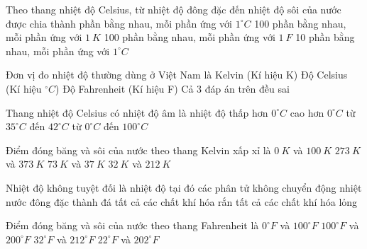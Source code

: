 \begin{ex}
	Theo thang nhiệt độ Celsius, từ nhiệt độ đông đặc đến nhiệt độ sôi của nước được chia thành
	\choice
	{ phần bằng nhau, mỗi phần ứng với $1^\circ C$}
	{100 phần bằng nhau, mỗi phần ứng với $1\ K$}
	{100 phần bằng nhau, mỗi phần ứng với $1\ F$}
	{10 phần bằng nhau, mỗi phần ứng với $1^\circ C$}
\end{ex}

\begin{ex}
	Đơn vị đo nhiệt độ thường dùng ở Việt Nam là
	\choice
	{Kelvin (Kí hiệu K)}
	{\True Độ Celsius (Kí hiệu $^\circ C$)}
	{Độ Fahrenheit (Kí hiệu F)}
	{Cả 3 đáp án trên đều sai}
\end{ex}
\begin{ex}
	Thang nhiệt độ Celsius có nhiệt độ âm là nhiệt độ
	\choice
	{\True thấp hơn $0^\circ C$}
	{cao hơn $0^\circ C$}
	{từ $35^\circ C$ đến $42^\circ C$}
	{từ $0^\circ C$ đến $100^\circ C$}
	\end{ex}



\begin{ex}
	Điểm đóng băng và sôi của nước theo thang Kelvin xấp xỉ là
	\choice
	{$0\ K$ và $100\ K$}
	{\True $273\ K$ và $373\ K$}
	{$73\ K$ và $37\ K$}
	{$32\ K$ và $212\ K$}
	\end{ex}


\begin{ex}
	Nhiệt độ không tuyệt đối là nhiệt độ tại đó 
	\choice
	{\True các phân tử không chuyển động nhiệt}
	{nước đông đặc thành đá}
	{tất cả các chất khí hóa rắn}
	{tất cả các chất khí hóa lỏng}
	\end{ex}
\begin{ex}
	Điểm đóng băng và sôi của nước theo thang Fahrenheit là
	\choice
	{$0^\circ F$ và $100^\circ F$}
	{$100^\circ F$ và $200^\circ F$}
	{\True $32^\circ F$ và $212^\circ F$}
	{$22^\circ F$ và $202^\circ F$}
	\end{ex}

